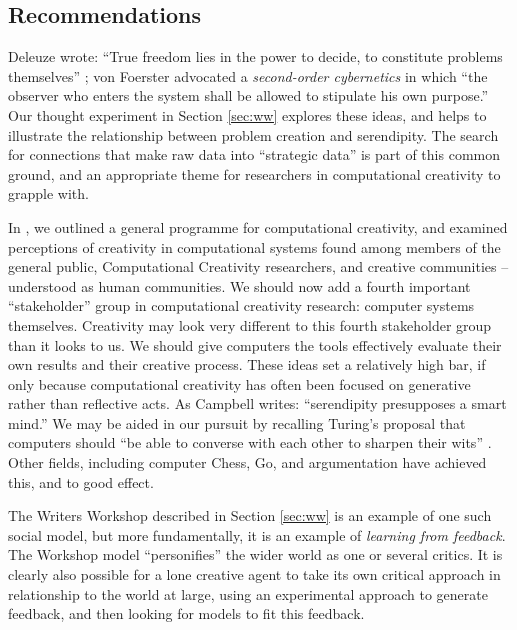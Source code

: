 \subsection{Recommendations} \label{sec:recommendations}

Deleuze wrote: ``True freedom lies in the power to decide, to
constitute problems themselves'' \cite[p. 15]{deleuze1991bergsonism};
von Foerster \citeyear[p. 286]{von2003cybernetics} advocated a \emph{second-order cybernetics} in which ``the observer who enters the system shall be allowed to stipulate his own purpose.''
Our thought experiment in Section \ref{sec:ww} explores these ideas,
and helps to illustrate the relationship between problem creation and
serendipity.  The search for connections that make raw data into
``strategic data'' is part of this common ground, and an appropriate
theme for researchers in computational creativity to grapple with.

In \cite{stakeholder-groups-bookchapter}, we outlined a general
programme for computational creativity, and examined perceptions of
creativity in computational systems found among members of the general
public, Computational Creativity researchers, and creative communities
-- understood as human communities.  We should now add a fourth
important ``stakeholder'' group in computational creativity research:
computer systems themselves.  Creativity may look very different to
this fourth stakeholder group than it looks to us.  We should give
computers the tools effectively evaluate their own results and their
creative process.
%
These ideas set a relatively high bar, if only because computational
creativity has often been focused on generative rather than reflective
acts.  As Campbell \citeyear{campbell} writes: ``serendipity
presupposes a smart mind.''  We may be aided in our pursuit by
recalling Turing's proposal that computers should ``be able to
converse with each other to sharpen their wits''
\cite{turing-intelligent}.  Other fields, including computer Chess,
Go, and argumentation have achieved this, and to good effect.

The Writers Workshop described in Section \ref{sec:ww} is an example
of one such social model, but more fundamentally, it is an example of
\emph{learning from feedback}.  The Workshop model ``personifies'' the
wider world as one or several critics.  It is clearly also possible
for a lone creative agent to take its own critical approach in relationship
to the world at large, using an experimental approach to generate
feedback, and then looking for models to fit this feedback.

